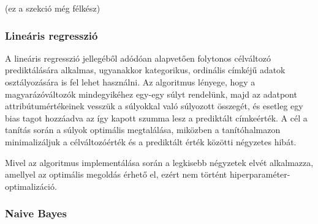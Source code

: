 \documentclass[12pt]{article}
\DeclareMathOperator*{\argmax}{arg\,max}
\begin{document}
(ez a szekció még félkész)

\subsubsection{Lineáris regresszió}

A lineáris regresszió jellegéből adódóan alapvetően folytonos célváltozó prediktálására alkalmas, ugyanakkor kategorikus, ordinális címkéjű adatok osztályozására is fel lehet használni. Az algoritmus lényege, hogy a magyarázóváltozók mindegyikéhez egy-egy súlyt rendelünk, majd az adatpont attribútumértékeinek vesszük a súlyokkal való súlyozott összegét, és esetleg egy bias tagot hozzáadva az így kapott szumma lesz a prediktált címkeérték. A cél a tanítás során a súlyok optimális megtalálása, miközben a tanítóhalmazon minimalizáljuk a célváltozóérték és a prediktált érték közötti négyzetes hibát.

Mivel az algoritmus implementálása során a legkisebb négyzetek elvét alkalmazza, amellyel az optimális megoldás érhető el, ezért nem történt hiperparaméter-optimalizáció.

\subsubsection{Naive Bayes}

%
%
\end{document}
